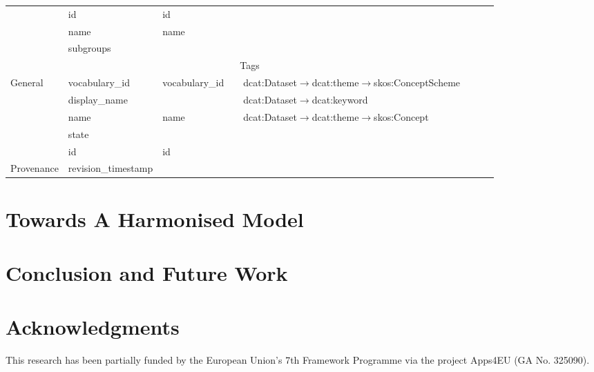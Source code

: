 \documentclass[runningheads,a4paper]{llncs}
\begin{document}
{\begin{longtable}{|p{1.5cm}|l|l|l|p{3cm}|m{3cm}|m{3cm}|c|}
\cline{2-8}
 & id & id &  &  &  &  & \tabularnewline
\cline{2-8}
 & name & name &  &  &  &  & \tabularnewline
\cline{2-8}
 & subgroups &  &  &  &  &  & \tabularnewline
\hline
\hline
\multicolumn{8}{|c|}{Tags}\tabularnewline
\hline
\hline
\multirow{5}{2cm}{General} & vocabulary\_id & vocabulary\_id &  & dcat:Dataset$\rightarrow$dcat:theme$\rightarrow$skos:ConceptScheme &  &  & \tabularnewline
\cline{2-8}
 & display\_name &  &  & dcat:Dataset$\rightarrow$dcat:keyword &  &  & \tabularnewline
\cline{2-8}
 & name & name &  & dcat:Dataset$\rightarrow$dcat:theme$\rightarrow$skos:Concept &  &  & \tabularnewline
\cline{2-8}
 & state &  &  &  &  &  & \tabularnewline
\cline{2-8}
 & id & id &  &  &  &  & \tabularnewline
\hline
\hline
Provenance & revision\_timestamp &  &  &  &  &  & \tabularnewline
\hline
\end{longtable}
}

\section{Towards A Harmonised Model}
\label{sec:hdl}


\section{Conclusion and Future Work}
\label{sec:conclusion}


\section{Acknowledgments}
This research has been partially funded by the European Union's 7th Framework Programme via the project Apps4EU (GA No. 325090).
\vspace{0.5cm}


\nocite{*}

\end{document}
